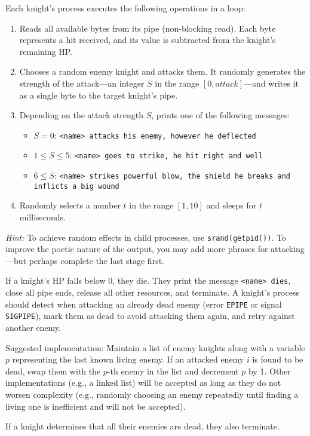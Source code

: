 \documentclass[addpoints,a4paper]{exam}
\begin{document}
\begin{questions}
  \question[6] Each knight's process executes the following operations in a loop:
  \begin{enumerate}
    \item Reads all available bytes from its pipe (non-blocking read). Each byte represents a hit received, and its value is subtracted from the knight’s remaining HP.
    \item Chooses a random enemy knight and attacks them. It randomly generates the strength of the attack—an integer $S$ in the range $[0, attack]$—and writes it as a single byte to the target knight’s pipe.
    \item Depending on the attack strength $S$, prints one of the following messages:
    \begin{itemize}
      \item $S = 0$: \texttt{<name> attacks his enemy, however he deflected}
      \item $1 \leq S \leq 5$: \texttt{<name> goes to strike, he hit right and well}
      \item $6 \leq S$: \texttt{<name> strikes powerful blow, the shield he breaks and inflicts a big wound}
    \end{itemize}
    \item Randomly selects a number $t$ in the range $[1,10]$ and sleeps for $t$ milliseconds.
  \end{enumerate}
  \textit{Hint:} To achieve random effects in child processes, use \texttt{srand(getpid())}.  
  To improve the poetic nature of the output, you may add more phrases for attacking—but perhaps complete the last stage first.

  \question[7] If a knight’s HP falls below $0$, they die. They print the message \texttt{<name> dies}, close all pipe ends, release all other resources, and terminate. A knight’s process should detect when attacking an already dead enemy (error \texttt{EPIPE} or signal \texttt{SIGPIPE}), mark them as dead to avoid attacking them again, and retry against another enemy.  

  Suggested implementation: Maintain a list of enemy knights along with a variable $p$ representing the last known living enemy. If an attacked enemy $i$ is found to be dead, swap them with the $p$-th enemy in the list and decrement $p$ by 1. Other implementations (e.g., a linked list) will be accepted as long as they do not worsen complexity (e.g., randomly choosing an enemy repeatedly until finding a living one is inefficient and will not be accepted).

  If a knight determines that all their enemies are dead, they also terminate.
\end{questions}
\end{document}
